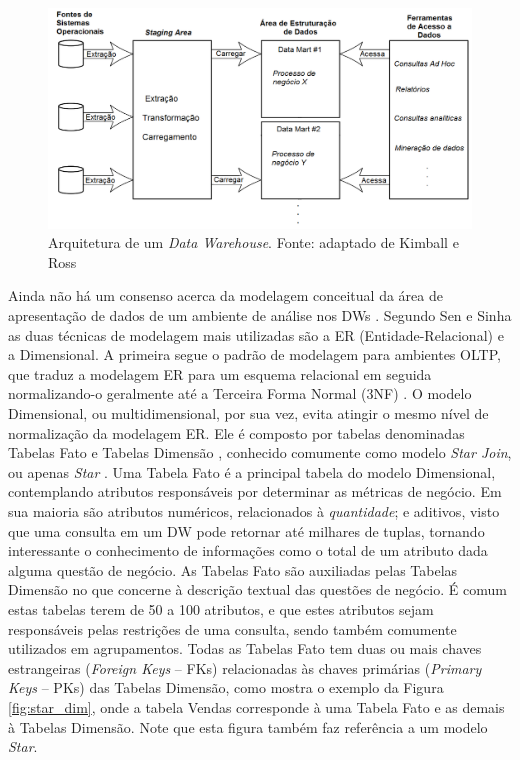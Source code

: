 \begin{figure}[htpb]
	\centering
		\includegraphics[width=\textwidth]{img/dw_arc}
	\caption{Arquitetura de um \textit{Data Warehouse}. Fonte: adaptado de Kimball e Ross \cite{kimball2002dw}}
	\label{fig:dw_arq}
\end{figure}

Ainda não há um consenso acerca da modelagem conceitual da área de apresentação de dados de um ambiente de análise nos DWs \cite{sen2005comparison}. Segundo Sen e Sinha \cite{sen2005comparison} as duas técnicas de modelagem mais utilizadas são a ER (Entidade-Relacional) e a Dimensional. A primeira segue o padrão de modelagem para ambientes OLTP, que traduz a modelagem ER para um esquema relacional em seguida normalizando-o geralmente até a Terceira Forma Normal (3NF) \cite{kimball2002dw}. O modelo Dimensional, ou multidimensional, por sua vez, evita atingir o mesmo nível de normalização da modelagem ER. Ele é composto por tabelas denominadas Tabelas Fato e Tabelas Dimensão \cite{kimball2002dw}, conhecido comumente como modelo \textit{Star Join}, ou apenas \textit{Star} \cite{sen2005comparison}. Uma Tabela Fato é a principal tabela do modelo Dimensional, contemplando atributos responsáveis por determinar as métricas de negócio. Em sua maioria são atributos numéricos, relacionados à \textit{quantidade}; e aditivos, visto que uma consulta em um DW pode retornar até milhares de tuplas, tornando interessante o conhecimento de informações como o total de um atributo dada alguma questão de negócio. As Tabelas Fato são auxiliadas pelas Tabelas Dimensão no que concerne à descrição textual das questões de negócio. É comum estas tabelas terem de 50 a 100 atributos, e que estes atributos sejam responsáveis pelas restrições de uma consulta, sendo também comumente utilizados em agrupamentos. Todas as Tabelas Fato tem duas ou mais chaves estrangeiras (\textit{Foreign Keys} -- FKs) relacionadas às chaves primárias (\textit{Primary Keys} -- PKs) das Tabelas Dimensão, como mostra o exemplo da Figura \ref{fig:star_dim}, onde a tabela Vendas corresponde à uma Tabela Fato e as demais à Tabelas Dimensão. Note que esta figura também faz referência a um modelo \textit{Star}.

